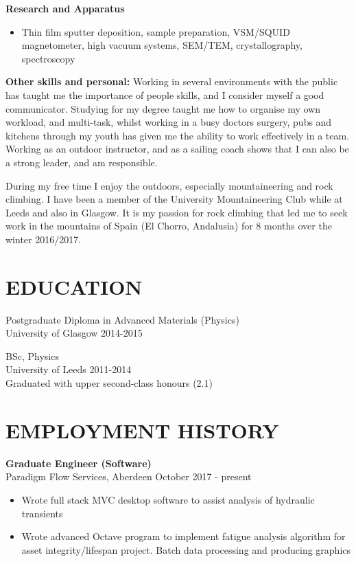 \documentclass[margin, line, 10pt]{res} %
\begin{document}
\begin{resume}
\textbf{Research and Apparatus} 
\begin{itemize}
\item Thin film sputter deposition, sample preparation, VSM/SQUID magnetometer, high vacuum systems, SEM/TEM, crystallography, spectroscopy
\end{itemize}

\textbf{Other skills and personal:}
Working in several environments with the public has taught me the importance of  people skills, and I consider myself a good communicator. Studying for my degree taught me how to organise my own workload, and multi-task, whilst working in a busy doctors surgery, pubs and kitchens through my youth has given me the ability to work effectively in a team. Working as an outdoor instructor, and as a sailing coach shows that I can also be a strong leader, and am responsible.\

During my free time I enjoy the outdoors, especially mountaineering and rock climbing. I have been a member of the University Mountaineering Club while at Leeds and also in Glasgow. It is my passion for rock climbing that led me to seek work in the mountains of Spain (El Chorro, Andalusia) for 8 months over the winter 2016/2017.

\section{EDUCATION}

Postgraduate Diploma in Advanced Materials (Physics)\\
University of Glasgow 2014-2015 \

BSc, Physics \\
University of Leeds 2011-2014 \\
Graduated with upper second-class honours (2.1) 

\section{EMPLOYMENT HISTORY}

\textbf{Graduate Engineer (Software)} \\
Paradigm Flow Services, Aberdeen \hfill October 2017 - present\\
\begin{itemize}

\item Wrote full stack MVC desktop software to assist analysis of hydraulic transients

\item Wrote advanced Octave program to implement fatigue analysis algorithm for asset integrity/lifespan project. Batch data processing and producing graphics


\end{itemize}
\end{resume}
\end{document}
